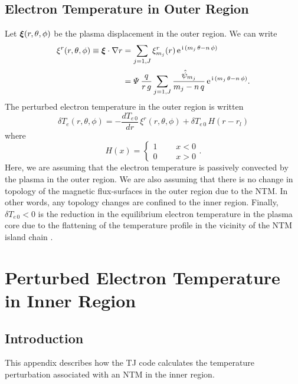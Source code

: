 \documentclass{iopjournal}
\newcommand {\bxi}{\mbox{\boldmath$\xi$}}
\begin{document}
{\subsection{Electron Temperature in Outer Region}
Let $\bxi(r,\theta,\phi)$ be the plasma displacement in the outer region. We can write \cite{tear10}
\begin{align}\label{xi}
\xi^r(r,\theta,\phi)\equiv \bxi\cdot\nabla r& = \sum_{j=1,J}\xi_{m_j}^r(r)\,{\rm e}^{\,{\rm i}\,(m_j\,\theta-n\,\phi)}\nonumber\\[0.5ex]
&=
{\mit\Psi}\,\frac{q}{r\,g}\sum_{j=1,J}\frac{\hat{\psi}_{m_j}}{m_j-n\,q}\, {\rm e}^{\,{\rm i}\,(m_j\,\theta-n\,\phi)}.
\end{align}
The perturbed electron temperature  in the outer region is written
\begin{equation}
\delta T_e(r,\theta,\phi)= -\frac{dT_{e\,0}}{dr}\, \xi^r(r,\theta,\phi) + \delta T_{e\,0}\,H(r-r_{l})
\end{equation}
where
\begin{equation}
H(x)= \left\{\begin{array}{ccc}1&~~~&x<0\\0&&x>0\end{array}\right..
\end{equation}
Here, we are assuming that the electron temperature is passively convected by the plasma in the outer region. We are also
assuming that there is no change in topology of the magnetic flux-surfaces in the outer region due to the NTM. In other words, any topology changes are
confined to  the inner region. Finally, $\delta T_{e\,0}<0$ is the reduction in the equilibrium electron temperature in the plasma
core due to the flattening of the temperature profile in the vicinity of the NTM island chain \cite{chang}.

\section{Perturbed Electron Temperature in Inner Region}\label{inner}

\subsection{Introduction}
This appendix describes how the TJ code calculates the temperature perturbation associated with an NTM in the inner region.

}
\end{document}
